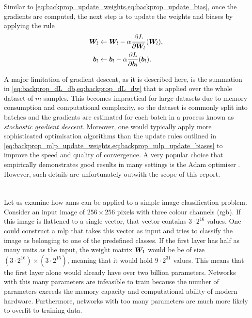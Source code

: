 \documentclass[../report.tex]{subfiles}
\begin{document}
Similar to \cref{eq:backprop_update_weights,eq:backprop_update_bias}, once the gradients are computed, the next step is to update the weights and biases by applying the rule
\begin{align}
    \label{eq:backprop_mlp_update_weights}
    {\bm{W}}_l &\gets {\bm{W}}_l - \alpha \frac{\partial L}{\partial {\bm{W}}_l}({\bm{W}}_l),\\
    \label{eq:backprop_mlp_update_biases}
    {\bm{b}}_l &\gets {\bm{b}}_l - \alpha \frac{\partial L}{\partial {\bm{b}}_l}({\bm{b}}_l).
\end{align}

A major limitation of gradient descent, as it is described here, is the summation in \cref{eq:backprop_dL_db,eq:backprop_dL_dw} that is applied over the whole dataset of $m$ samples. 
This becomes impractical for large datasets due to memory consumption and computational complexity, so the dataset is commonly split into batches and the gradients are estimated for each batch in a process known as \emph{stochastic gradient descent}.
Moreover, one would typically apply more sophisticated optimisation algorithms than the update rules outlined in \cref{eq:backprop_mlp_update_weights,eq:backprop_mlp_update_biases} to improve the speed and quality of convergence.
A very popular choice that empirically demonstrates good results in many settings is the Adam optimiser \cite{kingma2017}.
However, such details are unfortunately outwith the scope of this report.

\section{}
\label{sec:cnns}
Let us examine how \glspl{ann} can be applied to a simple image classification problem.
Consider an input image of $256 \times 256$ pixels with three colour channels (\gls{rgb}).
If this image is flattened to a single vector, that vector contains $3 \cdot 2^{16}$ values.
One could construct a \gls{mlp} that takes this vector as input and tries to classify the image as belonging to one of the predefined classes.
If the first layer has half as many units as the input, the weight matrix ${\bm{W}}_1$ would be be of size $(3 \cdot 2^{16}) \times (3 \cdot 2^{15})$, meaning that it would hold $9 \cdot 2^{31}$ values.
This means that the first layer alone would already have over two billion parameters.
Networks with this many parameters are infeasible to train because the number of parameters exceeds the memory capacity and computational ability of modern hardware.
Furthermore, networks with too many parameters are much more likely to overfit to training data.
\end{document}
